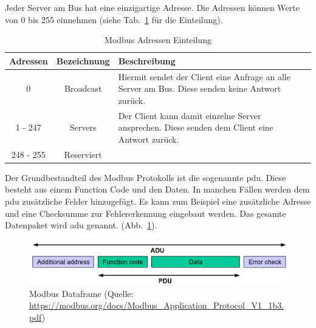 Jeder Server am Bus hat eine einzigartige Adresse. Die Adressen können Werte von 0 bis 255 einnehmen (siehe Tab.~\ref{tab:modbus_adressen} für die Einteilung). 
\begin{table}[h]
	\caption{Modbus Adressen Einteilung \label{tab:modbus_adressen}}
	\begin{tabularx}{\textwidth}{@{}c|c|X@{}}
		\toprule
		\textbf{Adressen} & \textbf{Bezeichnung} & \textbf{Beschreibung} \\
		\midrule
		0 & Broadcast & Hiermit sendet der Client eine Anfrage an alle Server am Bus. Diese senden keine Antwort zurück. \\
		1 - 247 & Servers & Der Client kann damit einzelne Server ansprechen. Diese senden dem Client eine Antwort zurück. \\
		248 - 255 & Reserviert & \\
		\bottomrule
	\end{tabularx}
\end{table}

Der Grundbestandteil des Modbus Protokolls ist die sogenannte \acf{pdu}. Diese besteht aus einem Function Code und den Daten. In manchen Fällen werden dem \acs{pdu} zusätzliche Felder hinzugefügt. Es kann zum Beispiel eine zusätzliche Adresse und eine Checksumme zur Fehlererkennung eingebaut werden. Das gesamte Datenpaket wird \acf{adu} genannt.
(Abb.~\ref{fig:modbus_adu_pdu}).
\begin{figure}[ht]
	\centering
	\includegraphics[width=1.0\linewidth]{Bilder/General_Modbus_Frame}
	\caption{Modbus Dataframe (Quelle: \url{https://modbus.org/docs/Modbus_Application_Protocol_V1_1b3.pdf})}
	\label{fig:modbus_adu_pdu}
\end{figure}

